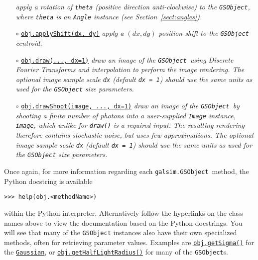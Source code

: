 \documentclass[preprint,11pt]{aastex}
\begin{document}
\begin{itemize}
  \newline \emph{apply a rotation of \texttt{theta} (positive direction
  anti-clockwise) to the \texttt{GSObject}, where \texttt{theta} is an
  \texttt{Angle} instance (see Section~\ref{sect:angles}).}
\item[$\circ$]
  \href{http://galsim-developers.github.com/GalSim/classgalsim_1_1base_1_1_g_s_object.html#a6b547741eeec4086de9abe227dae9325}{\texttt{obj.applyShift(dx,
      dy)}} \newline \emph{apply a $(dx, dy)$ position shift to the
    \texttt{GSObject} centroid.}
\item[$\circ$]
  \href{http://galsim-developers.github.com/GalSim/classgalsim_1_1base_1_1_g_s_object.html#ae0b346a8b438dedbc7f60a52220869d8}{\texttt{obj.draw(...,
      dx=1)}}
  \newline \emph{draw an image of the \texttt{GSObject}~using Discrete Fourier
  Transforms and interpolation to perform the image rendering.  The
  optional image sample scale \texttt{dx} (default \texttt{dx~=~1})
  should use the same units as used for the \texttt{GSObject} size parameters.}
\item[$\circ$]
  \href{http://galsim-developers.github.com/GalSim/classgalsim_1_1base_1_1_g_s_object.html#a42ac334d2840ba3fa832988e998beca0}{\texttt{obj.drawShoot(image,
      ..., dx=1)}}
  \newline \emph{draw an image of the \texttt{GSObject}~by shooting a finite number of
  photons into a user-supplied \texttt{Image} instance,
  \texttt{image}, which unlike for \texttt{draw()} is a required input.  The resulting rendering
  therefore contains stochastic noise, but uses few approximations. The
  optional image sample scale \texttt{dx} (default \texttt{dx~=~1})
  should use the same units as used for the \texttt{GSObject} size parameters.}
\end{itemize}
Once again, for more information regarding each \texttt{galsim.GSObject}~method,
the Python docstring is available

{\tt >>> help(obj.<methodName>)}

within the Python interpreter.  Alternatively follow the hyperlinks on
the class names above to view the documentation based
on the Python docstrings.  You will see that many of the \texttt{GSObject}
instances also have their own specialized methods, often for
retrieving parameter values. Examples are
\href{http://galsim-developers.github.com/GalSim/classgalsim_1_1base_1_1_gaussian.html#a418f2826a7b8934cfedc181de23ce826}{\texttt{obj.getSigma()}}
for the
\href{http://galsim-developers.github.com/GalSim/classgalsim_1_1base_1_1_gaussian.html}{\texttt{Gaussian}},
or
\href{http://galsim-developers.github.com/GalSim/classgalsim_1_1base_1_1_sersic.html#ad6ca39293c6b478fc052d07ea51d086f}{\texttt{obj.getHalfLightRadius()}}
for many of the \texttt{GSObject}s.
\end{document}
